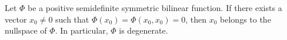 Let $\Phi$ be a positive semidefinite symmetric bilinear function. If there exists a vector $x_0 \neq 0$ such that $\Phi(x_0) = \Phi(x_0, x_0) = 0$, then $x_0$ belongs to the nullspace of $\Phi$. In particular, $\Phi$ is degenerate.
